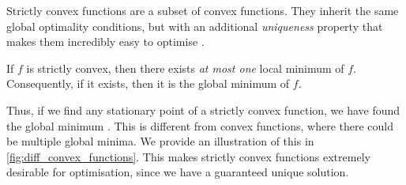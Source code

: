 Strictly convex functions are a subset of convex functions. They inherit the same global optimality conditions, but with an additional \textit{uniqueness} property that makes them incredibly easy to optimise \citep{NoceWrig06}.
\begin{definition}
    If $f$ is strictly convex, then there exists \textit{at most one} local minimum of $f$. Consequently, if it exists, then it is the global minimum of $f$.
\end{definition}
Thus, if we find any stationary point of a strictly convex function, we have found the global minimum \citep{NoceWrig06}. This is different from convex functions, where there could be multiple global minima. We provide an illustration of this in \cref{fig:diff_convex_functions}. This makes strictly convex functions extremely desirable for optimisation, since we have a guaranteed unique solution.

